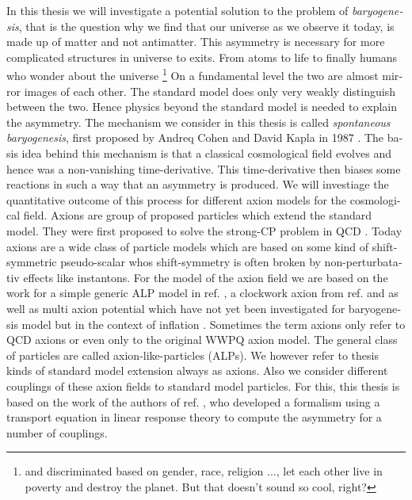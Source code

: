 \documentclass[master,       %
               twoside,        %
               BCOR10mm,       %
               english,ngerman, %
               ]{GAUBM}
\begin{document}
\begin{otherlanguage}{english}
In this thesis we will investigate a potential solution to the problem of \emph{baryogenesis}, that is
the question why we find that our universe as we observe it today, is made up of matter and not antimatter.
This asymmetry is necessary for more complicated structures in universe to exits. From atoms to life to finally humans who wonder about the universe \footnote{and discriminated based on gender, race, religion ..., let each other live in poverty and destroy the planet. But that doesn't sound so cool, right?}
On a fundamental level the two are almost mirror images of each other. The standard model does only very weakly distinguish between the two.
Hence physics beyond the standard model is needed to explain the asymmetry.
The mechanism we consider in this thesis is called \emph{spontaneous baryogenesis}, first proposed by Andreq Cohen and David Kapla in 1987 \cite{COHEN1987251} \cite{COHEN1988913}.
The basis idea behind this mechanism is that a classical cosmological field evolves and hence was a non-vanishing time-derivative.
This time-derivative then biases some reactions in such a way that an asymmetry is produced.
We will investiage the quantitative outcome of this process for different axion models for the cosmological field.
Axions are group of proposed particles which extend the standard model.
They were first proposed to solve the strong-CP problem in QCD \cite{PQ1} \cite{PQ2} \cite{Weinberg:1977ma} \cite{Wilczek:1977pj}. Today axions are a wide class of particle models which are based on some kind of shift-symmetric pseudo-scalar whos shift-symmetry is often broken by non-perturbatativ effects like instantons.
For the model of the axion field we are based on the work for a simple generic ALP model in ref. \cite{Kusenko_2015_Axion_Leptogenesis}, a clockwork axion from ref. \cite{Deformed_potential_Bae_2019} and \cite{general_cont_clockwork_Choi_2018} as well as multi axion potential which have not yet been investigated for baryogenesis model but in the context of inflation \cite{Kim_multi_axions:2004rp}.
Sometimes the term axions only refer to QCD axions or even only to the original WWPQ axion model. The general class of particles are called axion-like-particles (ALPs). We however refer to thesis kinds of standard model extension always as axions.
Also we consider different couplings of these axion fields to standard model particles. For this, this thesis is based on the work of the authors of ref. \cite{Domcke:2020kcp_Generic_Couplings}, who developed a formalism using a transport equation in linear response theory to compute the asymmetry for a number of couplings.

\end{otherlanguage}
\end{document}
